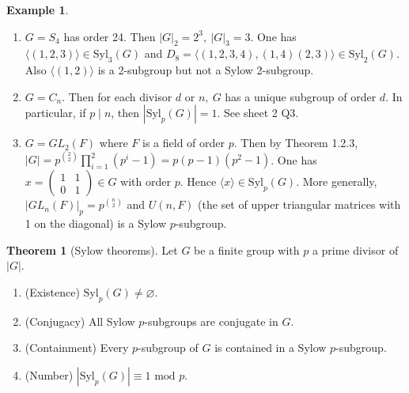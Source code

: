 \documentclass[a4paper]{article}
\newcommand{\Syl}{\text{Syl}}
\newcommand{\Mod}{\text{ mod }}
\theoremstyle{definition}
\newtheorem{thm}[defn]{Theorem}
\newtheorem{example}[defn]{Example}
\begin{document}
\begin{example}
\begin{enumerate}
\item $G=S_4$ has order 24. Then $|G|_2=2^3,\ |G|_3=3$. One has $\langle (1,2,3)\rangle\in\Syl_3(G)$ and $D_8=\langle (1,2,3,4),(1,4)(2,3)\rangle\in\Syl_2(G)$. Also $\langle(1,2)\rangle$ is a 2-subgroup but not a Sylow 2-subgroup.
\item $G=C_n$. Then for each divisor $d$ or $n,\ G$ has a unique subgroup of order $d$. In particular, if $p\mid n$, then $|\Syl_p(G)|=1$. See sheet 2 Q3.
\item $G=GL_2(F)$ where $F$ is a field of order $p$. Then by Theorem 1.2.3, $|G|=p^{\binom{2}{2}} \prod_{i=1}^2(p^i-1)=p(p-1)(p^2-1)$. One has $x=\begin{pmatrix}1&1\\0&1\end{pmatrix}\in G$ with order $p$. Hence $\langle x\rangle \in \Syl_p(G)$. More generally, $|GL_n(F)|_p=p^{\binom{n}{2}}$ and $U(n,F)$ (the set of upper triangular matrices with 1 on the diagonal) is a Sylow $p$-subgroup.
\end{enumerate}
\end{example}

\begin{thm}[Sylow theorems]
Let $G$ be a finite group with $p$ a prime divisor of $|G|$.
\begin{enumerate}
\item (Existence) $\Syl_p(G)\neq\varnothing$.
\item (Conjugacy) All Sylow $p$-subgroups are conjugate in $G$.
\item (Containment) Every $p$-subgroup of $G$ is contained in a Sylow $p$-subgroup.
\item (Number) $|\Syl_p(G)|\equiv 1\Mod p$.
\end{enumerate}
\end{thm}
\end{document}
